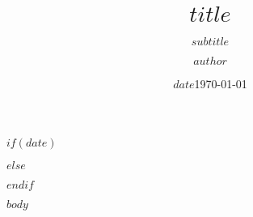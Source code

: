 \documentclass[10pt,aspectratio=43]{beamer}
\begin{document}
\author{$author$}
\title{$title$}
\subtitle{$subtitle$}

$if(date)$
\date{$date$}
$else$
\date{\today}
$endif$

\frame{\titlepage}


%  
%
%

$body$
\end{document}
